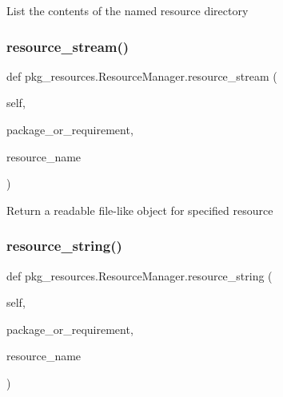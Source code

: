 \begin{DoxyVerb}List the contents of the named resource directory\end{DoxyVerb}
 \mbox{\label{classpkg__resources_1_1ResourceManager_a8656d0d38efd4f2afe70595e001838fc}} 
\subsubsection{\texorpdfstring{resource\+\_\+stream()}{resource\_stream()}}
{\footnotesize\ttfamily def pkg\+\_\+resources.\+Resource\+Manager.\+resource\+\_\+stream (\begin{DoxyParamCaption}\item[{}]{self,  }\item[{}]{package\+\_\+or\+\_\+requirement,  }\item[{}]{resource\+\_\+name }\end{DoxyParamCaption})}

\begin{DoxyVerb}Return a readable file-like object for specified resource\end{DoxyVerb}
 \mbox{\label{classpkg__resources_1_1ResourceManager_ae1e5f9bafec64d9271aea875f7d491bf}} 
\subsubsection{\texorpdfstring{resource\+\_\+string()}{resource\_string()}}
{\footnotesize\ttfamily def pkg\+\_\+resources.\+Resource\+Manager.\+resource\+\_\+string (\begin{DoxyParamCaption}\item[{}]{self,  }\item[{}]{package\+\_\+or\+\_\+requirement,  }\item[{}]{resource\+\_\+name }\end{DoxyParamCaption})}

